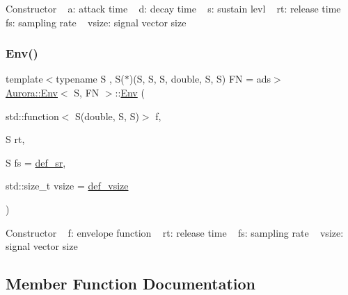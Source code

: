 Constructor ~\newline
a\+: attack time ~\newline
d\+: decay time ~\newline
s\+: sustain levl ~\newline
rt\+: release time ~\newline
fs\+: sampling rate ~\newline
vsize\+: signal vector size \mbox{\label{class_aurora_1_1_env_a500fe7e05d736a21c801ffa480aceed7}} 
\subsubsection{\texorpdfstring{Env()}{Env()}\hspace{0.1cm}{\footnotesize\ttfamily [3/3]}}
{\footnotesize\ttfamily template$<$typename S , S($\ast$)(\+S, S, S, double, S, S) FN = ads$>$ \\
\hyperlink{class_aurora_1_1_env}{Aurora\+::\+Env}$<$ S, FN $>$\+::\hyperlink{class_aurora_1_1_env}{Env} (\begin{DoxyParamCaption}\item[{std\+::function$<$ S(double, S, S)$>$}]{f,  }\item[{S}]{rt,  }\item[{S}]{fs = {\ttfamily \hyperlink{namespace_aurora_ad49263d809bea98dd422e95bc91bc03e}{def\+\_\+sr}},  }\item[{std\+::size\+\_\+t}]{vsize = {\ttfamily \hyperlink{namespace_aurora_afaaddf667a06e7ce23c667a8b7295263}{def\+\_\+vsize}} }\end{DoxyParamCaption})\hspace{0.3cm}{\ttfamily [inline]}}

Constructor ~\newline
f\+: envelope function ~\newline
rt\+: release time ~\newline
fs\+: sampling rate ~\newline
vsize\+: signal vector size 

\subsection{Member Function Documentation}
\mbox{\label{class_aurora_1_1_env_a8b83ca686cce4fc31b03b1de847bc062}} 
